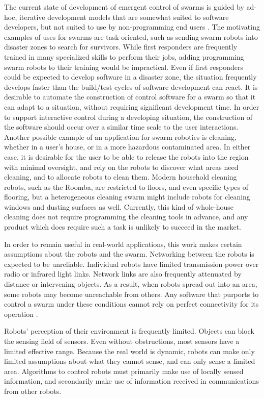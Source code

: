 \documentclass[]{article}
\begin{document}
The current state of development of emergent control of swarms is guided by ad-hoc, iterative development models that are somewhat suited to software developers, but not suited to use by non-programming end users \cite{palmer2005behavioral}.
The motivating examples of uses for swarms are task oriented, such as sending swarm robots into disaster zones to search for survivors. 
While first responders are frequently trained in many specialized skills to perform their jobs, adding programming swarm robots to their training would be impractical. 
Even if first responders could be expected to develop software in a disaster zone, the situation frequently develops faster than the build/test cycles of software development can react. 
It is desirable to automate the construction of control software for a swarm so that it can adapt to a situation, without requiring significant development time. 
In order to support interactive control during a developing situation, the construction of the software should occur over a similar time scale to the user interactions.
Another possible example of an application for swarm robotics is cleaning, whether in a user's house, or in a more hazardous contaminated area. 
In either case, it is desirable for the user to be able to release the robots into the region with minimal oversight, and rely on the robots to discover what areas need cleaning, and to allocate robots to clean them. 
Modern household cleaning robots, such as the Roomba, are restricted to floors, and even specific types of flooring, but a heterogeneous cleaning swarm might include robots for cleaning windows and dusting surfaces as well. 
Currently, this kind of whole-house cleaning does not require programming the cleaning tools in advance, and any product which does require such a task is unlikely to succeed in the market. 

In order to remain useful in real-world applications, this work makes certain assumptions about the robots and the swarm. 
Networking between the robots is expected to be unreliable. 
Individual robots have limited transmission power over radio or infrared light links. 
Network links are also frequently attenuated by distance or intervening objects. 
As a result, when robots spread out into an area, some robots may become unreachable from others. 
Any software that purports to control a swarm under these conditions cannot rely on perfect connectivity for its operation . 

Robots' perception of their environment is frequently limited. 
Objects can block the sensing field of sensors.
Even without obstructions, most sensors have a limited effective range. 
Because the real world is dynamic, robots can make only limited assumptions about what they cannot sense, and can only sense a limited area. 
Algorithms to control robots must primarily make use of locally sensed information, and secondarily make use of information received in communications from other robots. 
\end{document}
